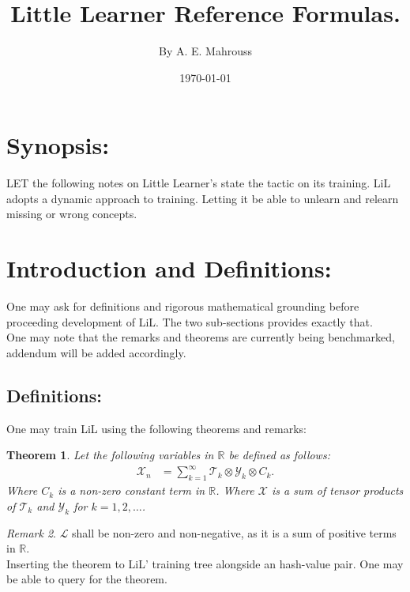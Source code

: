 \documentclass[10pt]{article}
\title{%
	\vspace{-1.5em}%
	\large\textbf{Little Learner Reference Formulas.}%
}
\author{By A. E. Mahrouss}
\date{\today}
\theoremstyle{plain}
\newtheorem{theorem}{Theorem}[section]
\theoremstyle{definition}
\theoremstyle{remark}
\newtheorem{remark}[theorem]{Remark}
\begin{document}

\maketitle
\tableofcontents
\newpage

\section{Synopsis:}

\lettrine[lines=1, lhang=0.1, loversize=0.2]{L}ET the following notes on Little Learner's state the tactic on its training. LiL adopts a dynamic approach to training. Letting it be able to unlearn and relearn missing or wrong concepts.

\section{Introduction and Definitions:}

One may ask for definitions and rigorous mathematical grounding before proceeding development of LiL. The two sub-sections provides exactly that.\\
One may note that the remarks and theorems are currently being benchmarked, addendum will be added accordingly.

\subsection{Definitions:}

One may train LiL using the following theorems and remarks:

\begin{theorem}
Let the following variables in $\mathbb{R}$ be defined as follows:
\begin{align*}
    \mathcal{X}_n &= \sum_{k=1}^{\infty} \mathcal{T}_k \otimes \mathcal{Y}_k \otimes C_k.
\end{align*}
Where $C_k$ is a non-zero constant term in $\mathbb{R}$. Where $\mathcal{X}$ is a sum of tensor products of $\mathcal{T}_k$ and $\mathcal{Y}_k$ for $k=1,2,\ldots$.
\end{theorem}

\begin{remark}
    $\mathcal{L}$ shall be non-zero and non-negative, as it is a sum of positive terms in $\mathbb{R}$.\\
	Inserting the theorem to LiL' training tree alongside an hash-value pair. One may be able to query for the theorem.
\end{remark}
\end{document}
